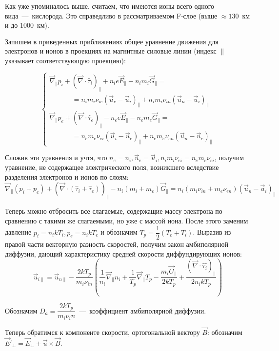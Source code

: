 \documentclass[14pt, a4paper, fleqn]{extarticle}
\begin{document}
Как уже упоминалось выше, считаем, что имеются ионы всего одного вида~---~кислорода. Это справедливо в рассматриваемом F-слое (выше $\approx 130$~км и до $1000$~км).

Запишем в приведенных приближениях общее уравнение движения для электронов и ионов в проекциях на магнитные силовые линии (индекс $\parallel$ указывает соответствующую проекцию):

$$\begin{cases}
\vec{\nabla}_\parallel p_i + (\vec{\nabla}\cdot \hat{\tau}_i)_\parallel + n_ie\vec{E}_\parallel-n_im_i\vec{G}_\parallel=\\
\textrm{ }\textrm{ }\textrm{ }\textrm{ }\textrm{ }=n_im_i\nu_{ie}(\vec{u}_e-\vec{u}_i)_\parallel+n_im_i\nu_{in}(\vec{u}_n-\vec{u}_i)_\parallel\\
\vec{\nabla}_\parallel p_e + (\vec{\nabla}\cdot \hat{\tau}_e)_\parallel - n_ee\vec{E}_\parallel-n_em_e\vec{G}_\parallel=\\
\textrm{ }\textrm{ }\textrm{ }\textrm{ }\textrm{ }=n_em_e\nu_{ei}(\vec{u}_i-\vec{u}_e)_\parallel+n_em_e\nu_{en}(\vec{u}_n-\vec{u}_e)_\parallel
\end{cases}$$

Сложив эти уравнения и учтя, что $n_e=n_i, \vec{u}_e=\vec{u}_i, n_im_i\nu_{ei}=n_em_e\nu_{ei}$, получим уравнение, не содержащее электрического поля, возникшего вследствие разделения электронов и ионов по слоям:
$$\vec{\nabla}_\parallel (p_i+p_e) + (\vec{\nabla}\cdot (\hat{\tau}_i+\hat{\tau}_e))_\parallel-n_i(m_i+m_e)\vec{G}_\parallel=n_i(m_i\nu_{in}+m_e\nu_{en})(\vec{u}_n-\vec{u}_i)_\parallel$$

Теперь можно отбросить все слагаемые, содержащие массу электрона по сравнению с такими же слагаемыми, но уже с массой иона. После этого заменим давление $p_i=n_ikT_i, p_e=n_ikT_e$ и обозначим $T_p=\dfrac{1}{2}(T_e+T_i)$. Выразив из правой части векторную разность скоростей, получим закон амбиполярной диффузии, дающий характеристику средней скорости диффундирующих ионов: 
$$\vec{u}_{i\parallel} = \vec{u}_{n\parallel} - \dfrac{2kT_p}{m_i\nu_{in}}\left(\dfrac{1}{n_i}\vec{\nabla}_\parallel n_i+\dfrac{1}{T_p}\vec{\nabla}_\parallel T_p-\dfrac{m_i\vec{G}_\parallel}{2kT_p}+\dfrac{(\vec{\nabla}\cdot\hat{\tau_i})_\parallel}{2n_ikT_p}\right)$$

Обозначим $D_a=\dfrac{2kT_p}{m_i\nu_in}$~---~коэффициент амбиполярной диффузии.

Теперь обратимся к компоненте скорости, ортогональной вектору $\vec{B}$: обозначим $\vec{E}'_\perp=\vec{E}_\perp+\vec{u}\times \vec{B}$.
\end{document}

